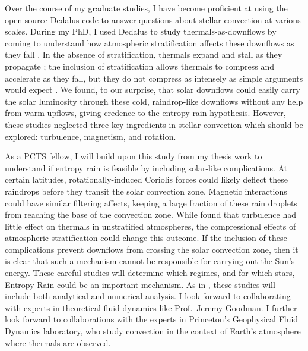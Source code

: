 \documentclass[11pt, preprint]{aastex}
\begin{document}
Over the course of my graduate studies, I have become proficient at using the open-source Dedalus \citep{burns&all2019} code to answer questions about stellar convection at various scales.
During my PhD, I used Dedalus to study thermals-as-downflows by coming to understand how atmospheric stratification affects these downflows as they fall \citep{andersLB2019}.
In the absence of stratification, thermals expand and stall as they propagate \citep{lecoanet&jeevanjee2019}; the inclusion of stratification allows thermals to compress and accelerate as they fall, but they do not compress as intensely as simple arguments would expect \citep{brandenburg2016}.
We found, to our surprise, that solar downflows could easily carry the solar luminosity through these cold, raindrop-like downflows without any help from warm upflows, giving credence to the entropy rain hypothesis.
However, these studies neglected three key ingredients in stellar convection which should be explored: turbulence, magnetism, and rotation.

As a PCTS fellow, I will build upon this study from my thesis work to understand if entropy rain is feasible by including solar-like complications.
At certain latitudes, rotationally-induced Coriolis forces could likely deflect these raindrops before they transit the solar convection zone.
Magnetic interactions could have similar filtering affects, keeping a large fraction of these rain droplets from reaching the base of the convection zone.
While \citet{lecoanet&jeevanjee2019} found that turbulence had little effect on thermals in unstratified atmospheres, the compressional effects of atmospheric stratification could change this outcome.
If the inclusion of these complications prevent downflows from crossing the solar convection zone, then it is clear that such a mechanism cannot be responsible for carrying out the Sun's energy.
These careful studies will determine which regimes, and for which stars, Entropy Rain could be an important mechanism.
As in \citet{andersLB2019}, these studies will include both analytical and numerical analysis.
I look forward to collaborating with experts in theoretical fluid dynamics like Prof.~Jeremy Goodman.
I further look forward to collaborations with the experts in Princeton's Geophysical Fluid Dynamics laboratory, who study convection in the context of Earth's atmosphere where thermals are observed.



\vspace{-0.8cm}
\end{document}

